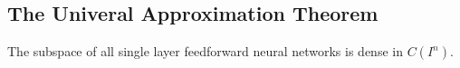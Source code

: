 \inputminted[fontsize=\small, framesep=0.35cm, frame=lines, python3=true]{python}{python/delta_rule.py}
\bigskip


\subsection{The Univeral Approximation Theorem}
\bigskip


\begin{theorem}\label{thm:universal_approximation}
    The subspace of all single layer feedforward neural networks is dense in \( C(I^n) \).
\end{theorem}


